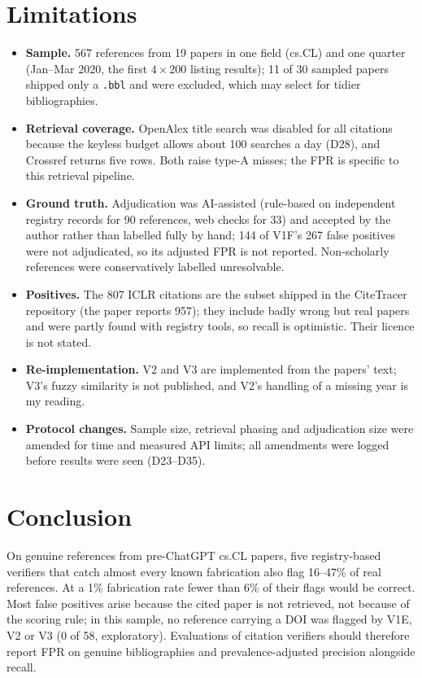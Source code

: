 \documentclass[conference]{IEEEtran}
\begin{document}
\section{Limitations}
\begin{itemize}
\item \textbf{Sample.} 567 references from 19 papers in one field (cs.CL) and one quarter (Jan--Mar 2020,
the first $4\times 200$ listing results); 11 of 30 sampled papers shipped only a \texttt{.bbl} and were
excluded, which may select for tidier bibliographies.
\item \textbf{Retrieval coverage.} OpenAlex title search was disabled for all citations because the keyless
budget allows about 100 searches a day (D28), and Crossref returns five rows. Both raise type-A misses; the
FPR is specific to this retrieval pipeline.
\item \textbf{Ground truth.} Adjudication was AI-assisted (rule-based on independent registry records for
90 references, web checks for 33) and accepted by the author rather than labelled fully by hand; 144 of
V1F's 267 false positives were not adjudicated, so its adjusted FPR is not reported. Non-scholarly
references were conservatively labelled unresolvable.
\item \textbf{Positives.} The 807 ICLR citations are the subset shipped in the CiteTracer repository (the
paper reports 957); they include badly wrong but real papers and were partly found with registry tools,
so recall is optimistic. Their licence is not stated.
\item \textbf{Re-implementation.} V2 and V3 are implemented from the papers' text; V3's fuzzy similarity is not
published, and V2's handling of a missing year is my reading.
\item \textbf{Protocol changes.} Sample size, retrieval phasing and adjudication size were amended for time and
measured API limits; all amendments were logged before results were seen (D23--D35).
\end{itemize}

\section{Conclusion}
On genuine references from pre-ChatGPT cs.CL papers, five registry-based verifiers that catch
almost every known fabrication also flag 16--47\% of real references. At a 1\% fabrication rate fewer than
6\% of their flags would be correct. Most false positives arise because the cited paper is not retrieved,
not because of the scoring rule; in this sample, no reference carrying a DOI was flagged by V1E, V2 or V3
(0 of 58, exploratory). Evaluations of
citation verifiers should therefore report FPR on genuine bibliographies and prevalence-adjusted
precision alongside recall.
\end{document}
